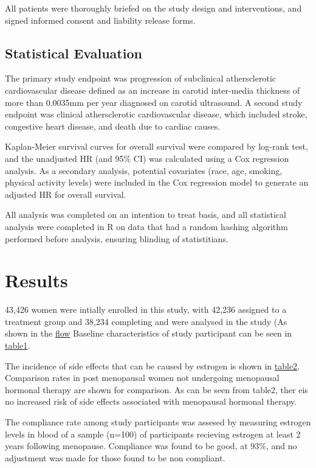 \documentclass[11pt]{article}
\begin{document}
		All patients were thoroughly briefed on the study design and interventions, and signed informed consent and liability release forms.


	\subsection{Statistical Evaluation}
		The primary study endpoint was progression of subclinical athersclerotic cardiovascular disease defined as an increase in carotid inter-media thickness of more than 0.0035mm per year diagnosed on carotid ultrasound.
		A second study endpoint was clinical athersclerotic cardiovascular disease, which included stroke, congestive heart disease, and death due to cardiac causes.


		Kaplan-Meier survival curves for overall survival were compared by log-rank test, and the unadjusted HR (and 95\% CI) was calculated using a Cox regression analysis.
		As a secondary analysis, potential covariates (race, age, smoking, physical activity levels) were included in the Cox regression model to generate an adjusted HR for overall survival.



		All analysis was completed on an intention to treat basis, and all statistical analysis were completed in R \cite{RCoreTeam2012} on data that had a random hashing algorithm performed before analysis, ensuring blinding of statistitians.



	\section{Results}
		43,426 women were intially enrolled in this study, with 42,236 assigned to a treatment group and 38,234 completing and were analysed in the study (As shown in the \hyperref[Study Flow]{flow}
		Baseline characteristics of study participant can be seen in \hyperref[Table 1]{table1}.


		The incidence of side effects that can be caused by estrogen is shown in \hyperref[Table 2]{table2}, Comparison rates in post menopausal women not undergoing menopausal hormonal therapy are shown for comparison.
		As can be seen from table2, ther eis no increased risk of side effects associated with menopausal hormonal therapy.




		The compliance rate among study participants was assesed by measuring estrogen levels in blood of a sample (n=100) of participants recieving estrogen at least 2 years following menopause. Compliance was found to be good, at 93\%, and no adjustment was made for those found to be non compliant.
\end{document}
